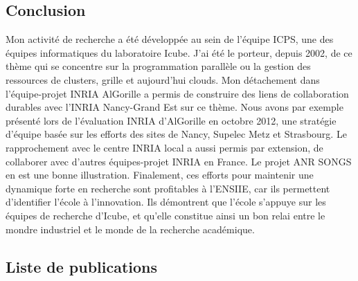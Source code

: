 \documentclass[11pt]{article}
\begin{document}
\subsection*{Conclusion}

Mon activité  de recherche a  été développée au sein  de l'équipe ICPS,  une des
équipes informatiques du laboratoire Icube. J'ai été le porteur, depuis 2002, de
ce  thème qui  se concentre  sur la  programmation parallèle  ou la  gestion des
ressources  de clusters,  grille et  aujourd'hui clouds.   Mon détachement  dans
l'équipe-projet  INRIA   AlGorille  a   permis  de   construire  des   liens  de
collaboration durables avec l'INRIA Nancy-Grand Est sur ce thème. Nous avons par
exemple présenté  lors de  l'évaluation INRIA d'AlGorille  en octobre  2012, une
stratégie d'équipe  basée sur les  efforts des sites  de Nancy, Supelec  Metz et
Strasbourg.  Le  rapprochement avec  le centre  INRIA local  a aussi  permis par
extension, de collaborer avec d'autres équipes-projet INRIA en France. Le projet
ANR SONGS en est une bonne  illustration. Finalement, ces efforts pour maintenir
une dynamique forte en recherche sont profitables à l'ENSIIE, car ils permettent
d'identifier l'école à l'innovation. Ils démontrent que l'école s'appuye sur les
équipes de recherche  d'Icube, et qu'elle constitue  ainsi un bon relai
entre le mondre industriel et le monde de la recherche académique. 

 



\subsectionfont{\sectionrule{3ex}{0pt}{-1ex}{0pt}}



\newpage
\subsection{Liste de publications}
\end{document}
